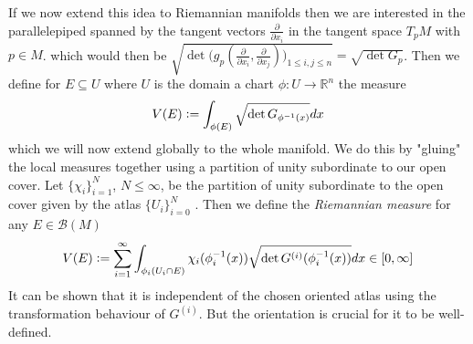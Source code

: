 \documentclass[12pt,a4paper]{article}
\numberwithin{equation}{subsection}
\numberwithin{lemma}{subsection}
\theoremstyle{definition}
\newcommand{\real}{\mathbb{R}}
\begin{document}
If we now extend this idea to Riemannian manifolds then we are interested 
in the parallelepiped spanned by the tangent vectors $\frac{\partial}{\partial x_i}$
in the tangent space $T_p M$ with $p \in M$.
which would then be $ \sqrt{\det \big( g_p(\frac{\partial}{\partial x_i}, 
\frac{\partial}{\partial x_j}) \big)_{1\leq i,j \leq n} } = 
\sqrt{ \det G_p }$. Then we define for $E \subseteq U$ where $U$ is 
the domain a chart $\phi: U \rightarrow \real^n$ the measure 
\begin{align*}
    V(E) \vcentcolon= \int_{\phi(E)} \sqrt{ \det G_{\phi^{-1}(x)}} dx 
\end{align*} 
which we will now extend globally to the whole manifold. We do this 
by "gluing" the local measures together using a partition of unity subordinate 
to our open cover. 
Let $\{ \chi_i \}_{i=1}^N$, $N \leq \infty$, be the partition of unity 
subordinate to the open cover given by the atlas $\{U_i\}_{i = 0}^N$ . Then we define the 
\textit{Riemannian measure} for any $E \in \mathcal{B}(M)$
\begin{align*}
    V(E) \vcentcolon= \sum\limits_{i=1}^\infty \int_{\phi_i(U_i \cap E)}
        \chi_i(\phi_i^{-1}(x)) \sqrt{\det G^{(i)}(\phi_i^{-1}(x))} dx 
        \in [0,\infty]
\end{align*}
It can be shown that it is independent of the chosen oriented atlas 
using the transformation behaviour of $G^{(i)}$. But the orientation is 
crucial for it to be well-defined. 
\end{document}
